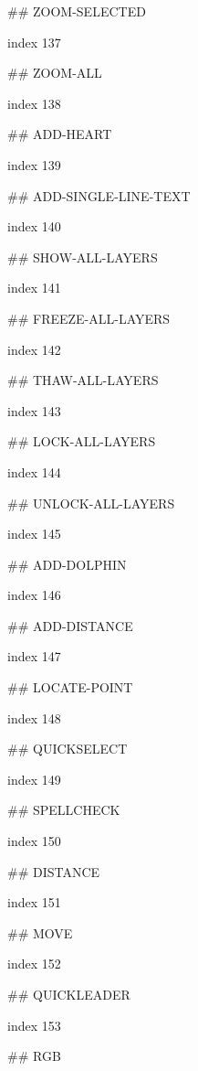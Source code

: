## ZOOM-SELECTED

index 137



## ZOOM-ALL

index 138



## ADD-HEART

index 139



## ADD-SINGLE-LINE-TEXT

index 140



## SHOW-ALL-LAYERS

index 141



## FREEZE-ALL-LAYERS

index 142



## THAW-ALL-LAYERS

index 143



## LOCK-ALL-LAYERS

index 144



## UNLOCK-ALL-LAYERS

index 145



## ADD-DOLPHIN

index 146



## ADD-DISTANCE

index 147



## LOCATE-POINT

index 148



## QUICKSELECT

index 149



## SPELLCHECK

index 150



## DISTANCE

index 151



## MOVE

index 152



## QUICKLEADER

index 153



## RGB

